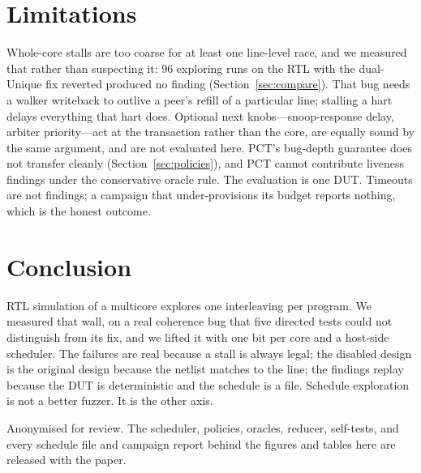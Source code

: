 \documentclass[sigconf,anonymous,review]{acmart}
\begin{document}
\section{Limitations}
\label{sec:limit}

Whole-core stalls are too coarse for at least one line-level race,
and we measured that rather than suspecting it: 96 exploring runs on
the RTL with the dual-Unique fix reverted produced no finding
(Section~\ref{sec:compare}). That bug needs a walker writeback to
outlive a peer's refill of a particular line; stalling a hart delays
everything that hart does. Optional next knobs---snoop-response delay,
arbiter priority---act at the transaction rather than the core, are
equally sound by the same argument, and are not evaluated here. PCT's bug-depth guarantee does not transfer cleanly
(Section~\ref{sec:policies}), and PCT cannot contribute liveness
findings under the conservative oracle rule. The evaluation is one
DUT. Timeouts are not findings; a campaign that under-provisions its
budget reports nothing, which is the honest outcome.

\section{Conclusion}
\label{sec:conc}

RTL simulation of a multicore explores one interleaving per program.
We measured that wall, on a real coherence bug that five directed
tests could not distinguish from its fix, and we lifted it with one
bit per core and a host-side scheduler. The failures are real because
a stall is always legal; the disabled design is the original design
because the netlist matches to the line; the findings replay because
the DUT is deterministic and the schedule is a file. Schedule
exploration is not a better fuzzer. It is the other axis.

\begin{acks}
Anonymised for review. The scheduler, policies, oracles, reducer,
self-tests, and every schedule file and campaign report behind the
figures and tables here are released with the paper.
\end{acks}



\end{document}
